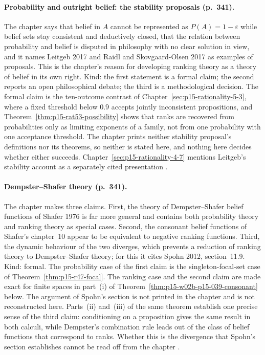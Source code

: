 \paragraph{Probability and outright belief: the stability proposals (p.~341).}
The chapter says that belief in \(A\) cannot be represented as
\(P(A)=1-\varepsilon\) while belief sets stay consistent and deductively
closed, that the relation between probability and belief is disputed in
philosophy with no clear solution in view, and it names Leitgeb 2017 and
Raidl and Skovgaard-Olsen 2017 as examples of proposals.  This is the
chapter's reason for developing ranking theory as a theory of belief in its
own right.  Kind: the first statement is a formal claim; the second reports
an open philosophical debate; the third is a methodological decision.  The
formal claim is the ten-outcome contrast of Chapter~\ref{sec:p15-rationality-5-3}, where a fixed threshold
below \(0.9\) accepts jointly inconsistent propositions, and
Theorem~\ref{thm:p15-rat53-possibility} shows that ranks are recovered from
probabilities only as limiting exponents of a family, not from one
probability with one acceptance threshold.  The chapter prints neither
stability proposal's definitions nor its theorems, so neither is stated here,
and nothing here decides whether either succeeds.
Chapter~\ref{sec:p15-rationality-4-7} mentions Leitgeb's stability account
as a separately cited presentation
\parencite[pp.~338, 341]{KernIsbernerSkovgaardOlsenSpohn2021Ranking}.

\paragraph{Dempster--Shafer theory (p.~341).}
The chapter makes three claims.  First, the theory of Dempster--Shafer
belief functions of Shafer 1976 is far more general and contains both
probability theory and ranking theory as special cases.  Second, the
consonant belief functions of Shafer's chapter~10 appear to be equivalent to
negative ranking functions.  Third, the dynamic behaviour of the two diverges,
which prevents a reduction of ranking theory to Dempster--Shafer theory; for
this it cites Spohn 2012, section~11.9.  Kind: formal.  The probability case
of the first claim is the singleton-focal-set case of
Theorem~\ref{thm:p15-r47-focal}.  The ranking case and the second claim are
made exact for finite spaces in part~(i) of
Theorem~\ref{thm:p15-w02b-p15-039-consonant} below.  The argument of
Spohn's section is not printed in the chapter and is not reconstructed here.
Parts~(ii) and~(iii) of the same theorem establish one precise sense of the
third claim: conditioning on a proposition gives the same result in both
calculi, while Dempster's combination rule leads out of the class of belief
functions that correspond to ranks.  Whether this is the divergence that
Spohn's section establishes cannot be read off from the chapter
\parencite[p.~341]{KernIsbernerSkovgaardOlsenSpohn2021Ranking}.

